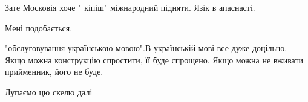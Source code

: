 \begin{itemize}
Зате Московія хоче " кіпіш" міжнародний підняти. Язік в апаснасті.

 
Мені подобається.

 

"обслуговування українською мовою".В українській мові все дуже доцільно. Якщо
можна конструкцію спростити, її буде спрощено. Якщо можна не вживати
прийменник, його не буде.


 
Лупаємо цю скелю далі💛💙


\end{itemize}

